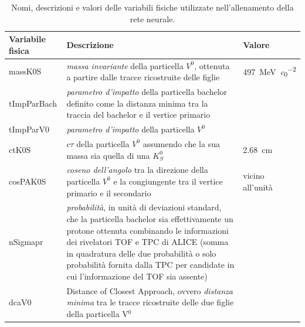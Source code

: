     \begin{table}[p]
        \centering
        \begin{tabular}{|>{\centering\arraybackslash}m{3cm}|>{\centering\arraybackslash}m{8.2cm}|>{\centering\arraybackslash}m{3cm}|}
            \hline
            \textbf{Variabile fisica} & \textbf{Descrizione} & \textbf{Valore} \\ 
            \hline
            massK0S & \textit{massa invariante} della particella $V^{0}$, ottenuta a partire dalle tracce ricostruite delle figlie & \qty{497}{\mega \eV \per \clight^2} \\ 
            \hline
            tImpParBach & \textit{parametro d'impatto} della particella bachelor definito come la distanza minima tra la traccia del bachelor e il vertice primario & \\ 
            \hline
            tImpParV0 & \textit{parametro d'impatto} della particella $V^{0}$ & \\ 
            \hline
            ctK0S & $c \tau$ della particella $V^{0}$ assumendo che la sua massa sia quella di una $K^{0}_{S}$ & \qty{2.68}{\centi \meter} \\ 
            \hline
            cosPAK0S & \textit{coseno dell'angolo} tra la direzione della particella $V^{0}$ e la congiungente tra il vertice primario e il secondario & vicino all'unità \\ 
            \hline
            nSigmapr & \textit{probabilità}, in unità di deviazioni standard, che la particella bachelor sia effettivamente un protone ottenuta combinando le informazioni dei rivelatori TOF e TPC di ALICE (somma in quadratura delle due probabilità o solo probabilità fornita dalla TPC per candidate in cui l'informazione del TOF sia assente) & \\ 
            \hline
            dcaV0 & Distance of Closest Approach, ovvero \textit{distanza minima} tra le tracce ricostruite delle due figlie della particella V$^{0}$ & \\ 
            \hline
        \end{tabular}
        \caption{Nomi, descrizioni e valori delle variabili fisiche utilizzate nell’allenamento della rete neurale.}
        \label{tab:3-1-vars}
    \end{table}
    
